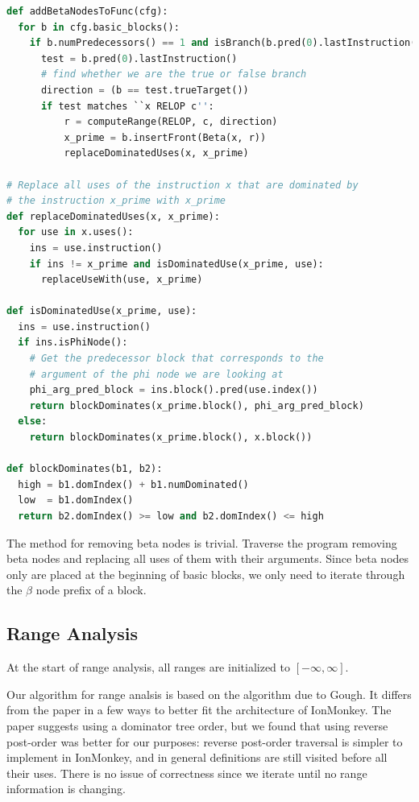 \documentclass{article}
\begin{document}
\begin{lstlisting}[language=Python,
                   caption={Pseudocode algorithm for inserting beta nodes},
                   label={lst:add_betas}, float=ht]
def addBetaNodesToFunc(cfg):
  for b in cfg.basic_blocks():
    if b.numPredecessors() == 1 and isBranch(b.pred(0).lastInstruction()):
      test = b.pred(0).lastInstruction()
      # find whether we are the true or false branch
      direction = (b == test.trueTarget())
      if test matches ``x RELOP c'':
          r = computeRange(RELOP, c, direction)
          x_prime = b.insertFront(Beta(x, r))
          replaceDominatedUses(x, x_prime)

# Replace all uses of the instruction x that are dominated by
# the instruction x_prime with x_prime
def replaceDominatedUses(x, x_prime):
  for use in x.uses():
    ins = use.instruction()
    if ins != x_prime and isDominatedUse(x_prime, use):
      replaceUseWith(use, x_prime)

def isDominatedUse(x_prime, use):
  ins = use.instruction()
  if ins.isPhiNode():
    # Get the predecessor block that corresponds to the
    # argument of the phi node we are looking at
    phi_arg_pred_block = ins.block().pred(use.index())
    return blockDominates(x_prime.block(), phi_arg_pred_block)
  else:
    return blockDominates(x_prime.block(), x.block())

def blockDominates(b1, b2):
  high = b1.domIndex() + b1.numDominated()
  low  = b1.domIndex()
  return b2.domIndex() >= low and b2.domIndex() <= high
\end{lstlisting}

The method for removing beta nodes is trivial. Traverse the program
removing beta nodes and replacing all uses of them with their
arguments. Since beta nodes only are placed at the beginning of basic
blocks, we only need to iterate through the $\beta$ node prefix of a
block.

\subsection{Range Analysis}

At the start of range analysis, all ranges are initialized to
$[-\infty, \infty]$.

Our algorithm for range analsis is based on the algorithm due to Gough. It
differs from the paper in a few ways to better fit the architecture of
IonMonkey. The paper suggests using a dominator tree order, but we found that
using reverse post-order was better for our purposes: reverse post-order
traversal is simpler to implement in IonMonkey, and in general definitions are
still visited before all their uses. There is no issue of correctness since we
iterate until no range information is changing.
\end{document}

